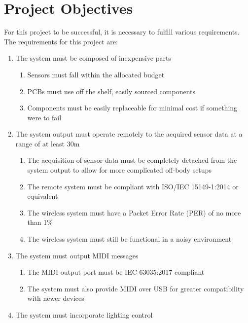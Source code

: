 \section{Project Objectives}
For this project to be successful, it is necessary to fulfill various requirements.
The requirements for this project are:

\begin{enumerate}
    \item The system must be composed of inexpensive parts
    \begin{enumerate}
        \item Sensors must fall within the allocated budget
        \item PCBs must use off the shelf, easily sourced components
        \item Components must be easily replaceable for minimal cost if something were to fail
    \end{enumerate}
    \item The system output must operate remotely to the acquired sensor data at a range of at least 30m
    \begin{enumerate}
        \item The acquisition of sensor data must be completely detached from the system output
        to allow for more complicated off-body setups
        \item The remote system must be compliant with ISO/IEC 15149-1:2014 or equivalent
        \item The wireless system must have a Packet Error Rate (PER) of no more than 1\%
        \item The wireless system must still be functional in a noisy environment
    \end{enumerate}
    \item The system must output MIDI messages
    \begin{enumerate}
        \item The MIDI output port must be IEC 63035:2017 compliant
        \item The system must also provide MIDI over USB for greater compatibility with newer devices
    \end{enumerate}
    \item The system must incorporate lighting control
\end{enumerate}

